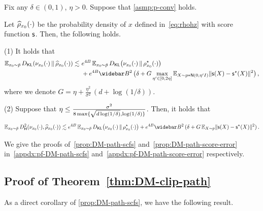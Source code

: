 \begin{proposition}\label{prop:DM-path-score-error}
    Fix any $\delta\in(0,1)$, $\eta>0$. Suppose that \cref{asmp:p-conv} holds.

    Let $\widehat{\rho}_{x_0}(\cdot)$ be the probability density of $x$ defined in~\eqref{eq:rhohz} with score function $\mathsf{s}$. Then, the following holds.

(1) It holds that
\begin{align*}
    \En_{\xz\sim \breve p} \Dkl{\piz{\cdot}}{\rhohz{\cdot}}
    \leqsim&~ e^{4B}\En_{\xz\sim \breve p} \Dkl{\piz{\cdot}}{\rhosz{\cdot}} \\
    &~ +e^{4B}\Bbar^2\, \bigl(\delta+G\max_{\eta'\in[0,2\eta]}\En_{X\sim p*\normal{0,\eta'\Id}}\nrm{\scf(X)-\scfs(X)}^2\bigr)\,,
\end{align*}
where we denote $G=\eta+\frac{\eta^2}{\sigma^2}\,(d+\log(1/\delta))$.


(2) Suppose that $\eta\leq \frac{\sigma^2}{8\max\{\sqrt{d\log(1/\delta)},\log(1/\delta)\}}$. Then, it holds that
\begin{align*}
    \En_{\xz\sim \breve p} \Dhels{\piz{\cdot}}{\rhohz{\cdot}}
    \leqsim e^{4B}\En_{\xz\sim \breve p} \Dkl{\piz{\cdot}}{\rhosz{\cdot}}+e^{4B}\Bbar^2\, (\delta+G\En_{X\sim p}\nrm{\scf(X)-\scfs(X)}^2)\,.
\end{align*}
\end{proposition}

We give the proofs of~\cref{prop:DM-path-scfs} and~\cref{prop:DM-path-score-error} in~\cref{appdx:pf-DM-path-scfs} and~\cref{appdx:pf-DM-path-score-error} respectively.


\subsection{Proof of Theorem~\ref{thm:DM-clip-path}}


As a direct corollary of \cref{prop:DM-path-scfs}, we have the following result.

